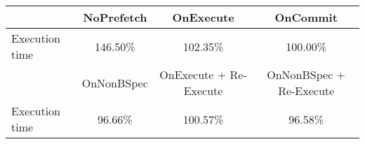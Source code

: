 \begin{tabular}{ l|ccc }
 & NoPrefetch & OnExecute & OnCommit\\ \hline
Execution time & 146.50\% & 102.35\% & 100.00\%\\ \hline
\hline
 & OnNonBSpec & OnExecute + Re-Execute & OnNonBSpec + Re-Execute\\ \hline
Execution time & 96.66\% & 100.57\% & 96.58\%\\ \hline
\end{tabular}

